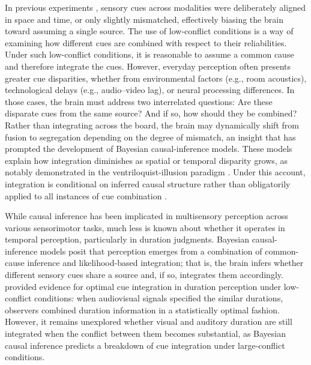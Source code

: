\documentclass{biorxiv}
\providecommand{\citep}[1]{\cite{#1}}
\begin{document}
In previous experiments \citep{shams2005sound,hartcher2014duration}, sensory cues across modalities were deliberately aligned in space and time, or only slightly mismatched, effectively biasing the brain toward assuming a single source. The use of low-conflict conditions is a way of examining how different cues are combined with respect to their reliabilities. Under such low-conflict conditions, it is reasonable to assume a common cause and therefore integrate the cues. However, everyday perception often presents greater cue disparities, whether from environmental factors (e.g., room acoustics), technological delays (e.g., audio--video lag), or neural processing differences. In those cases, the brain must address two interrelated questions: Are these disparate cues from the same source? And if so, how should they be combined? Rather than integrating across the board, the brain may dynamically shift from fusion to segregation depending on the degree of mismatch, an insight that has prompted the development of Bayesian causal-inference models. These models explain how integration diminishes as spatial or temporal disparity grows, as notably demonstrated in the ventriloquist-illusion paradigm \citep{shams2005sound,kording2007causal,hong2021causal}. Under this account, integration is conditional on inferred causal structure rather than obligatorily applied to all instances of cue combination \citep{kording2007causal,badde2018vision, badde2021causal,hong2021causal, badde2023multisensory, li2025precision}. 


While causal inference has been implicated in multisensory perception across various sensorimotor tasks, much less is known about whether it operates in temporal perception, particularly in duration judgments.  Bayesian causal-inference models posit that perception emerges from a combination of common-cause inference and likelihood-based integration; that is, the brain infers whether different sensory cues share a source and, if so, integrates them accordingly. \cite{hartcher2014duration} provided evidence for optimal cue integration in duration perception under low-conflict conditions: when audiovisual signals specified the similar durations, observers combined duration information in a statistically optimal fashion. However, it remains unexplored whether visual and auditory duration are still integrated when the conflict between them becomes substantial, as Bayesian causal inference predicts a breakdown of cue integration under large-conflict conditions. 
\end{document}
